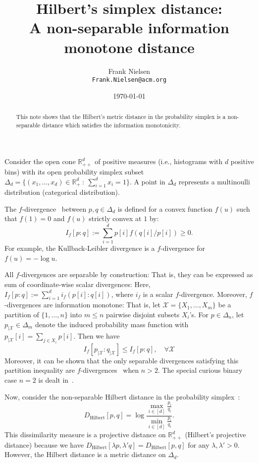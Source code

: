 \documentclass{article}
\title{Hilbert's simplex distance:\\ A non-separable information monotone distance}
\author{Frank Nielsen\\ {\tt Frank.Nielsen@acm.org}}
\date{\today}
\def\bbR{\mathbb{R}}
\def\bbR{\mathbb{R}}
\def\calX{\mathcal{X}}
\def\Hilbert{\mathrm{Hilbert}}
\begin{document}
\maketitle

\begin{abstract}
This note shows that the Hilbert's metric distance in the probability simplex is a non-separable distance which satisfies the information monotonicity. 
\end{abstract}

Consider the open cone $\bbR_{++}^d$ of positive measures (i.e., histograms with $d$ positive bins) with its open probability simplex subset 
$\Delta_d=\{(x_1,\ldots,x_d)\in\bbR_+^d\ :\ \sum_{i=1}^d  x_i=1\}$. A point in $\Delta_d$ represents a multinoulli distribution (categorical distribution).

The $f$-divergence~\cite{amari2016information} between $p,q\in\Delta_d$ is defined for a convex function $f(u)$ such that $f(1)=0$ and $f(u)$ strictly convex at $1$ by:
$$
I_f[p:q]:=\sum_{i=1}^d p[i] f(q[i]/p[i])\geq 0.
$$
For example, the Kullback-Leibler divergence is a $f$-divergence for $f(u)=-\log u$.

All $f$-divergences are separable by construction: 
That is, they can be expressed as sum of coordinate-wise scalar divergences: Here, $I_f[p:q]:=\sum_{i=1}^d i_{f}(p[i]:q[i])$, where $i_f$ is a scalar $f$-divergence.
Moreover, $f$-divergences are information monotone: 
That is, let $\calX=\{X_1,\ldots, X_m\}$ be a partition of $\{1,\ldots, n\}$ into $m\leq n$ pairwise disjoint subsets $X_i$'s.
For $p\in\Delta_n$, let $p_{|\calX}\in\Delta_m$ denote the induced probability mass function with $p_{|\calX}[i]=\sum_{j\in X_i} p[i]$.
Then we have
$$
I_f[p_{|\calX}:q_{|\calX}]\leq I_f[p:q], \quad\forall\calX
$$ 
Moreover, it can be shown that the only separable divergences satisfying this partition inequality are $f$-divergences~\cite{amari2016information} when $n>2$. The special curious binary case $n=2$ is dealt in~\cite{jiao2014information}.

Now, consider the non-separable Hilbert distance in the probability simplex~\cite{nielsen2019clustering}:
$$
D_\Hilbert[p,q]=\log \frac{\max_{i\in [d]} \frac{p_i}{q_i}}{\min_{i\in [d]} \frac{p_i}{q_i}}. 
$$
This dissimilarity measure is a projective distance on $\bbR^d_{++}$ (Hilbert's projective distance) because 
we have $D_\Hilbert[\lambda p,\lambda' q]=D_\Hilbert[p,q]$ for any $\lambda,\lambda'>0$.
However, the Hilbert distance is a metric distance on $\Delta_d$.
\end{document}
